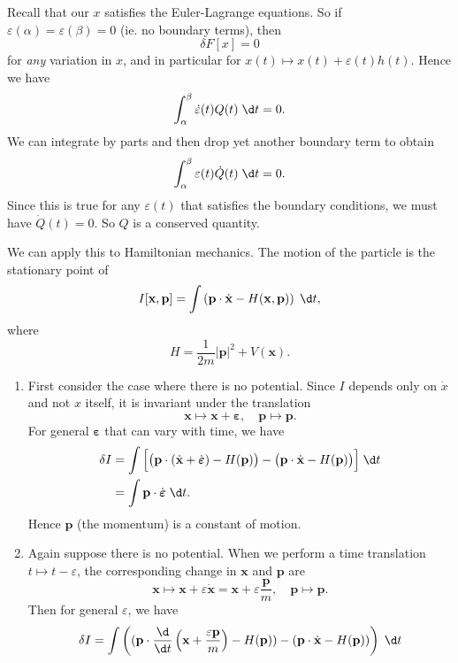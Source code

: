 \documentclass[a4paper]{article}
\begin{document}
Recall that our $x$ satisfies the Euler-Lagrange equations. So if $\varepsilon(\alpha) = \varepsilon(\beta) = 0$ (ie. no boundary terms), then
\[
  \delta F[x] = 0
\]
for \emph{any} variation in $x$, and in particular for $x(t) \mapsto x(t) + \varepsilon(t) h(t)$. Hence we have
\[
  \int_\alpha^\beta \dot{\varepsilon}(t)Q(t)\;\d t = 0.
\]
We can integrate by parts and then drop yet another boundary term to obtain
\[
  \int_\alpha^\beta \varepsilon(t)\dot{Q}(t)\;\d t = 0. 
\]
Since this is true for any $\varepsilon(t)$ that satisfies the boundary conditions, we must have $\dot{Q}(t) = 0$. So $Q$ is a conserved quantity.

\begin{eg}
  We can apply this to Hamiltonian mechanics. The motion of the particle is the stationary point of 
  \[
    I[\mathbf{x}, \mathbf{p}] = \int \left(\mathbf{p}\cdot \dot{\mathbf{x}} - H(\mathbf{x}, \mathbf{p})\right)\;\d t,
  \]
  where
  \[
    H = \frac{1}{2m} |\mathbf{p}|^2 + V(\mathbf{x}).
  \]
  \begin{enumerate}
    \item First consider the case where there is no potential. Since $I$ depends only on $\dot{x}$ and not $x$ itself, it is invariant under the translation 
      \[
        \mathbf{x}\mapsto \mathbf{x} + \boldsymbol\varepsilon,\quad \mathbf{p}\mapsto \mathbf{p}.
      \]
      For general $\boldsymbol\varepsilon$ that can vary with time, we have
      \begin{align*}
        \delta I &= \int \Big[\big(\mathbf{p}\cdot (\dot{\mathbf{x}} + \dot{\boldsymbol\varepsilon}) - H(\mathbf{p})\big) - \big(\mathbf{p}\cdot \dot{\mathbf{x}} - H(\mathbf{p})\big)\Big]\;\d t\\
        &= \int \mathbf{p}\cdot \dot{\boldsymbol\varepsilon}\;\d t.
      \end{align*}
      Hence $\mathbf{p}$ (the momentum) is a constant of motion.
    \item Again suppose there is no potential. When we perform a time translation $t \mapsto t - \varepsilon$, the corresponding change in $\mathbf{x}$ and $\mathbf{p}$ are 
      \[
        \mathbf{x}\mapsto \mathbf{x} + \varepsilon \dot{\mathbf{x}} = \mathbf{x} + \varepsilon \frac{\mathbf{p}}{m},\quad \mathbf{p}\mapsto \mathbf{p}.
      \]
      Then for general $\varepsilon$, we have
      \begin{align*}
        \delta I &= \int \left((\mathbf{p}\cdot \frac{\d}{\d t}\left(\mathbf{x} + \frac{\varepsilon \mathbf{p}}{m}\right) - H(\mathbf{p})) - (\mathbf{p}\cdot \dot{\mathbf{x}} - H(\mathbf{p}))\right)\;\d t\\

\end{align*}
\end{enumerate}
\end{eg}
\end{document}
